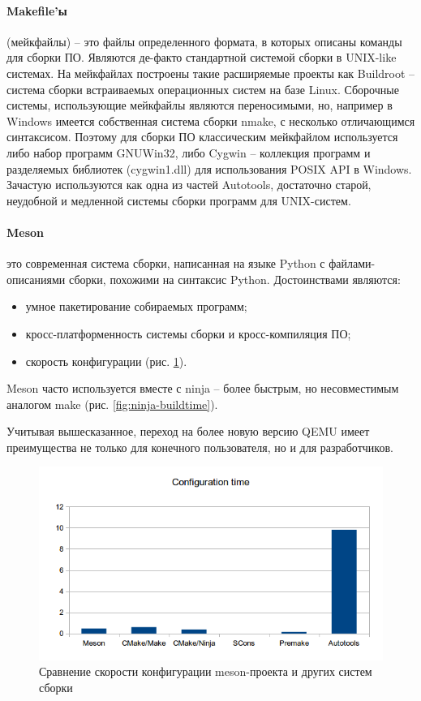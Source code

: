 \paragraph{Makefile'ы} (мейкфайлы) -- это файлы определенного формата, в которых описаны команды для сборки
ПО. Являются де-факто стандартной системой сборки в UNIX-like системах.
На мейкфайлах построены такие расширяемые проекты как Buildroot -- система сборки встраиваемых операционных систем на базе Linux.
Сборочные системы, использующие мейкфайлы являются переносимыми, но, например в Windows
имеется собственная система сборки nmake, с несколько отличающимся синтаксисом.
Поэтому для сборки ПО классическим мейкфайлом используется либо набор программ GNUWin32, либо Cygwin \cite{cygwin} --
коллекция программ и разделяемых библиотек (cygwin1.dll) для использования POSIX API в Windows.
Зачастую используются как одна из частей Autotools, достаточно старой, неудобной и медленной системы
сборки программ для UNIX-систем.

\paragraph{Meson} это современная система сборки, написанная на языке Python с файлами-описаниями
сборки, похожими на синтаксис Python. Достоинствами являются:
\begin{itemize}
    \item умное пакетирование собираемых программ;
    \item кросс-платформенность системы сборки и кросс-компиляция ПО;
    \item скорость конфигурации (рис. \ref{fig:meson-conftime}).
\end{itemize}

Meson часто используется вместе с ninja -- более быстрым, но несовместимым аналогом make (рис. \ref{fig:ninja-buildtime}).

Учитывая вышесказанное, переход на более новую версию QEMU имеет преимущества не только для
конечного пользователя, но и для разработчиков.


\begin{figure}[!htbp]
    \centering
    \begin{adjustbox}{max totalsize={0.8\textwidth}{\textheight}}
        \includegraphics[]{images/conftime.png}
    \end{adjustbox}
    \caption{Сравнение скорости конфигурации meson-проекта и других систем сборки}\label{fig:meson-conftime}
\end{figure}


